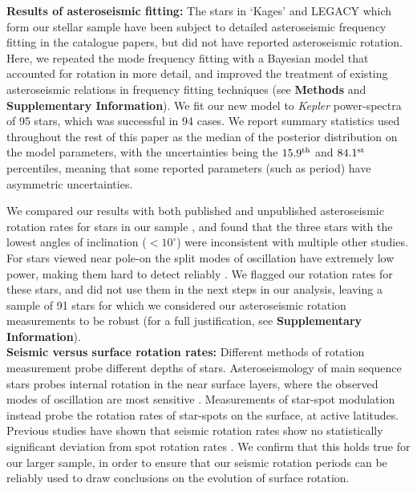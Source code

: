 \documentclass[12pt]{article}
\newcommand{\kepler}{\emph{Kepler}\xspace}
\begin{document}
\textbf{Results of asteroseismic fitting:} The stars in `Kages' and LEGACY which form our stellar sample have been subject to detailed asteroseismic frequency fitting in the catalogue papers, but did not have reported asteroseismic rotation. Here, we repeated the mode frequency fitting with a Bayesian model that accounted for rotation in more detail, and improved the treatment of existing asteroseismic relations in frequency fitting techniques (see \textbf{Methods} and \textbf{Supplementary Information}). We fit our new model to \kepler power-spectra of 95 stars, which was successful in 94 cases. We report summary statistics used throughout the rest of this paper as the median of the posterior distribution on the model parameters, with the uncertainties being the $15.9^{\rm th}$ and $84.1^{\rm st}$ percentiles, meaning that some reported parameters (such as period) have asymmetric uncertainties.

We compared our results with both published and unpublished asteroseismic rotation rates for stars in our sample \cite{nielsen+2015,davies+2015,davies+2016, lund+2017, benomar+2018}, and found that the three stars with the lowest angles of inclination ($< 10^\circ$) were inconsistent with multiple other studies. For stars viewed near pole-on the split modes of oscillation have extremely low power, making them hard to detect reliably \cite{lund+2014}. We flagged our rotation rates for these stars, and did not use them in the next steps in our analysis, leaving a sample of 91 stars for which we considered our asteroseismic rotation measurements to be robust (for a full justification, see \textbf{Supplementary Information}).\\

\textbf{Seismic versus surface rotation rates:} Different methods of rotation measurement probe different depths of stars. Asteroseismology of main sequence stars probes internal rotation in the near surface layers, where the observed modes of oscillation are most sensitive \cite{lund+2014}. Measurements of star-spot modulation instead probe the rotation rates of star-spots on the surface, at active latitudes. Previous studies have shown that seismic rotation rates show no statistically significant deviation from spot rotation rates \cite{nielsen+2015, benomar+2015}. We confirm that this holds true for our larger sample, in order to ensure that our seismic rotation periods can be reliably used to draw conclusions on the evolution of surface rotation.
\end{document}
